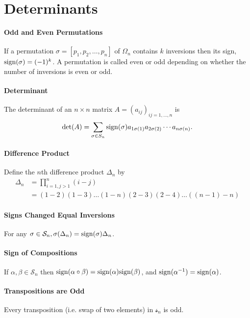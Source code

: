 \section{Determinants}

\paragraph{Odd and Even Permutations}
If a permutation \(\sigma = [p_1, p_2, \dots, p_n]\) of \(\Omega_n\) contains \(k\) inversions then its sign, \(\mathrm{sign}(\sigma) = (-1)^k\). A permutation is called even or odd depending on whether the number of inversions is even or odd.

\paragraph{Determinant}
The determinant of an \(n \times n\) matrix \(A = (a_{ij})_{ij=1,\dots,n}\) is
\[\det(A) = \sum_{\sigma \in S_n} \mathrm{sign}(\sigma)a_{1\sigma(1)}a_{2\sigma(2)} \cdots a_{n\sigma(n)}.\]

\paragraph{Difference Product}
Define the \(n\)th difference product \(\Delta_n\) by 
\begin{align*}
  \Delta_n & = \prod_{i=1,j>1}^n (i-j) \\
  & = (1-2)(1-3) \dots (1-n)(2-3)(2-4) \dots ((n-1) - n)
\end{align*}

\paragraph{Signs Changed Equal Inversions}
For any \(\sigma \in \mathcal{S}_n, \sigma(\Delta_n) = \mathrm{sign}(\sigma)\Delta_n\).

\paragraph{Sign of Compositions}
If \(\alpha, \beta \in \mathcal{S}_n\) then \(\mathrm{sign}(\alpha \circ \beta) = \mathrm{sign}(\alpha)\mathrm{sign}(\beta)\), and \(\mathrm{sign}(\alpha^{-1}) = \mathrm{sign}(\alpha)\).

\paragraph{Transpositions are Odd}
Every transposition (i.e. swap of two elements) in \(\mathcal{s}_n\) is odd.

